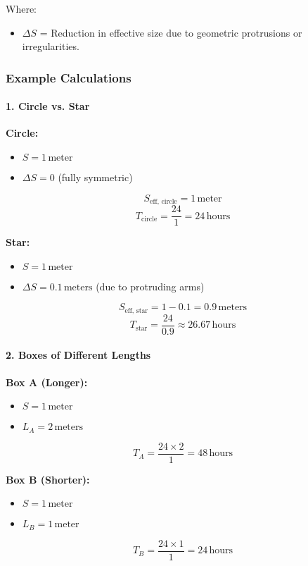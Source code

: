\documentclass[12pt]{article}
\begin{document}
Where:
\begin{itemize}
    \item \( \Delta S \) = Reduction in effective size due to geometric protrusions or irregularities.
\end{itemize}

\subsubsection{Example Calculations}

\paragraph{1. Circle vs. Star}

\textbf{Circle:}
\begin{itemize}
    \item \( S = 1 \, \text{meter} \)
    \item \( \Delta S = 0 \) (fully symmetric)
\end{itemize}
\[
S_{\text{eff, circle}} = 1 \, \text{meter}
\]
\[
T_{\text{circle}} = \frac{24}{1} = 24 \, \text{hours}
\]

\textbf{Star:}
\begin{itemize}
    \item \( S = 1 \, \text{meter} \)
    \item \( \Delta S = 0.1 \, \text{meters} \) (due to protruding arms)
\end{itemize}
\[
S_{\text{eff, star}} = 1 - 0.1 = 0.9 \, \text{meters}
\]
\[
T_{\text{star}} = \frac{24}{0.9} \approx 26.67 \, \text{hours}
\]

\paragraph{2. Boxes of Different Lengths}

\textbf{Box A (Longer):}
\begin{itemize}
    \item \( S = 1 \, \text{meter} \)
    \item \( L_A = 2 \, \text{meters} \)
\end{itemize}
\[
T_A = \frac{24 \times 2}{1} = 48 \, \text{hours}
\]

\textbf{Box B (Shorter):}
\begin{itemize}
    \item \( S = 1 \, \text{meter} \)
    \item \( L_B = 1 \, \text{meter} \)
\end{itemize}
\[
T_B = \frac{24 \times 1}{1} = 24 \, \text{hours}
\]
\end{document}
